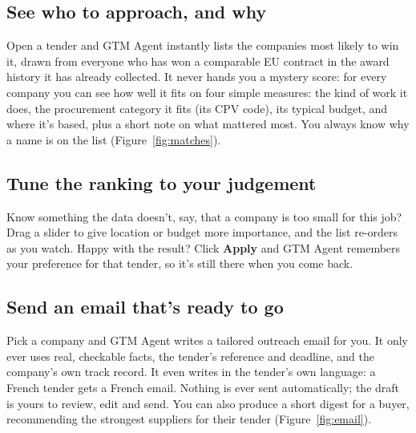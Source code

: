 
\subsection{See who to approach, and why}\label{lead-matching}

Open a tender and GTM Agent instantly lists the companies most likely to win it,
drawn from everyone who has won a comparable EU contract in the award history it has
already collected. It
never hands you a mystery score: for every company you can see how well it fits on
four simple measures: the kind of work it does, the procurement category it fits
(its CPV code), its typical budget, and where it's based, plus a
short note on what mattered most. You always know why a name is on the list (Figure~\ref{fig:matches}).

\subsection{Tune the ranking to your judgement}\label{adjustable-weighting}

Know something the data doesn't, say, that a company is too small for this job?
Drag a slider to give location or budget more importance, and the list re-orders as
you watch. Happy with the result? Click \textbf{Apply} and GTM Agent remembers your
preference for that tender, so it's still there when you come back.


\subsection{Send an email that's ready to go}\label{email-generation}

Pick a company and GTM Agent writes a tailored outreach email for you. It only ever
uses real, checkable facts, the tender's reference and deadline, and the company's
own track record. It even writes in the tender's own
language: a French tender gets a French email. Nothing is ever sent automatically;
the draft is yours to review, edit and send. You can also produce a short digest for
a buyer, recommending the strongest suppliers for their tender (Figure~\ref{fig:email}).

